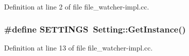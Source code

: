 Definition at line 2 of file file\_\-watcher-\/impl.cc.

\hypertarget{file__watcher-impl_8cc_aa2d5c758628dddfa26e73ca5a245222a}{
\subsubsection[{SETTINGS}]{\setlength{\rightskip}{0pt plus 5cm}\#define SETTINGS~Setting::GetInstance()}}
\label{file__watcher-impl_8cc_aa2d5c758628dddfa26e73ca5a245222a}


Definition at line 13 of file file\_\-watcher-\/impl.cc.

